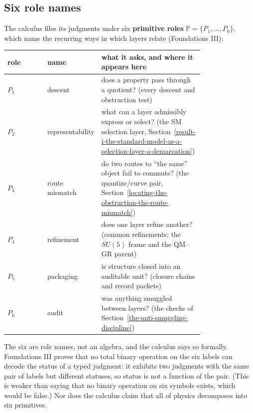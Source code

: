 \documentclass[11pt]{article}
\theoremstyle{definition}
\begin{document}
\subsection{Six role names}\label{the-six-primitive-roles}

The calculus files its judgments under six \textbf{primitive roles} \(\mathbb P=\{P_1,\dots,P_6\}\), which name the
recurring ways in which layers relate (Foundations III):

\begin{center}
\small
\begin{tabular}{@{}lp{0.26\linewidth}p{0.52\linewidth}@{}}
\toprule
role & name & what it asks, and where it appears here\\
\midrule
\(P_1\) & descent & does a property pass through a quotient? (every descent and obstruction test)\\
\(P_2\) & representability & what can a layer admissibly express or select? (the SM selection layer,
Section~\ref{result-i-the-standard-model-as-a-selection-layer-a-demarcation})\\
\(P_3\) & route mismatch & do two routes to ``the same'' object fail to commute? (the quantize/curve pair,
Section~\ref{locating-the-obstruction-the-route-mismatch})\\
\(P_4\) & refinement & does one layer refine another? (common refinements; the \(SU(5)\) frame and the QM--GR parent)\\
\(P_5\) & packaging & is structure closed into an auditable unit? (closure chains and record packets)\\
\(P_6\) & audit & was anything smuggled between layers? (the checks of Section~\ref{the-anti-smuggling-discipline})\\
\bottomrule
\end{tabular}
\end{center}

The six are role names, not an algebra, and the calculus says so formally. Foundations III proves that no total binary
operation on the six labels can decode the status of a typed judgment: it exhibits two judgments with the same pair of
labels but different statuses, so status is not a function of the pair. (This is weaker than saying that no binary
operation on six symbols exists, which would be false.) Nor does the calculus claim that all of physics decomposes into
six primitives.
\end{document}
